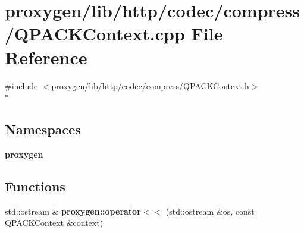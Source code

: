 \section{proxygen/lib/http/codec/compress/\+Q\+P\+A\+C\+K\+Context.cpp File Reference}
\label{QPACKContext_8cpp}
{\ttfamily \#include $<$proxygen/lib/http/codec/compress/\+Q\+P\+A\+C\+K\+Context.\+h$>$}\\*
\subsection*{Namespaces}
\begin{DoxyCompactItemize}
\item 
 {\bf proxygen}
\end{DoxyCompactItemize}
\subsection*{Functions}
\begin{DoxyCompactItemize}
\item 
std\+::ostream \& {\bf proxygen\+::operator$<$$<$} (std\+::ostream \&os, const Q\+P\+A\+C\+K\+Context \&context)
\end{DoxyCompactItemize}
